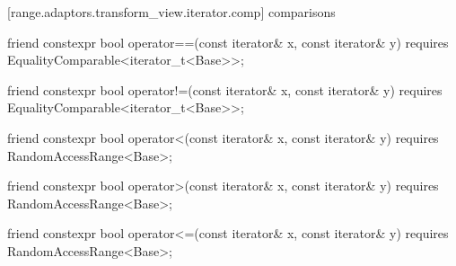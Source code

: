 [range.adaptors.transform_view.iterator.comp]{ comparisons}

\begin{itemdecl}
friend constexpr bool operator==(const iterator& x, const iterator& y)
  requires EqualityComparable<iterator_t<Base>>;
\end{itemdecl}

\begin{itemdescr}
\pnum
\oldtxt{\returns} 
\end{itemdescr}

%
\begin{itemdecl}
friend constexpr bool operator!=(const iterator& x, const iterator& y)
  requires EqualityComparable<iterator_t<Base>>;
\end{itemdecl}

\begin{itemdescr}
\pnum
\oldtxt{\returns} 
\end{itemdescr}

%
\begin{itemdecl}
friend constexpr bool operator<(const iterator& x, const iterator& y)
  requires RandomAccessRange<Base>;
\end{itemdecl}

\begin{itemdescr}
\pnum
\oldtxt{\returns} 
\end{itemdescr}

%
\begin{itemdecl}
friend constexpr bool operator>(const iterator& x, const iterator& y)
  requires RandomAccessRange<Base>;
\end{itemdecl}

\begin{itemdescr}
\pnum
\oldtxt{\returns} 
\end{itemdescr}

%
\begin{itemdecl}
friend constexpr bool operator<=(const iterator& x, const iterator& y)
  requires RandomAccessRange<Base>;
\end{itemdecl}

